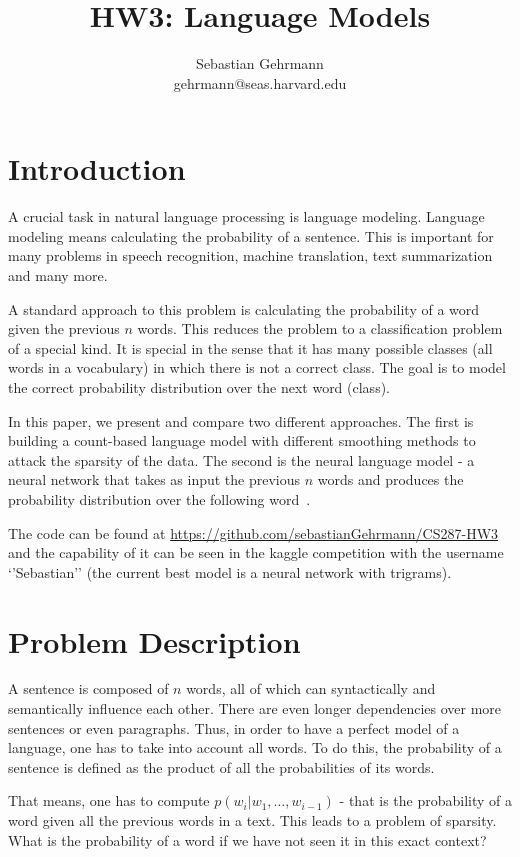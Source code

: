 \documentclass[11pt]{article}
\title{HW3: Language Models}
\author{Sebastian Gehrmann \\ gehrmann@seas.harvard.edu}
\begin{document}
\maketitle{}
\section{Introduction}

A crucial task in natural language processing is language modeling. Language modeling means calculating the probability of a sentence. This is important for many problems in speech recognition, machine translation, text summarization and many more. 

A standard approach to this problem is calculating the probability of a word given the previous $n$ words. 
This reduces the problem to a classification problem of a special kind. It is special in the sense that it has many possible classes (all words in a vocabulary) in which there is not a correct class. The goal is to model the correct probability distribution over the next word (class).


In this paper, we present and compare two different approaches. The first is building a count-based language model with different smoothing methods to attack the sparsity of the data. The second is the neural language model - a neural network that takes as input the previous $n$ words and produces the probability distribution over the following word~\citep{Bengio2003neural}.

The code can be found at \url{https://github.com/sebastianGehrmann/CS287-HW3} and the capability of it can be seen in the kaggle competition with the username `'Sebastian'' (the current best model is a neural network with trigrams).


\section{Problem Description}

A sentence is composed of $n$ words, all of which can syntactically and semantically influence each other. There are even longer dependencies over more sentences or even paragraphs. Thus, in order to have a perfect model of a language, one has to take into account all words. To do this, the probability of a sentence is defined as the product of all the probabilities of its words. 

That means, one has to compute $p(w_i|w_1, \ldots ,w_{i-1})$ - that is the probability of a word given all the previous words in a text. This leads to a problem of sparsity. What is the probability of a word if we have not seen it in this exact context?
\end{document}

